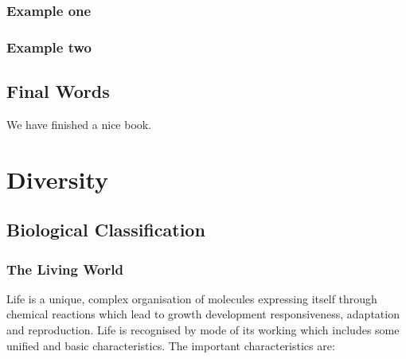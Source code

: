 \documentclass[
]{book}
\begin{document}
\hypertarget{example-one}{%
\section{Example one}\label{example-one}}

\hypertarget{example-two}{%
\section{Example two}\label{example-two}}

\hypertarget{final-words}{%
\chapter{Final Words}\label{final-words}}

We have finished a nice book.

\hypertarget{part-diversity}{%
\part{Diversity}\label{part-diversity}}

\hypertarget{biological-classification}{%
\chapter{Biological Classification}\label{biological-classification}}

\hypertarget{the-living-world}{%
\section{The Living World}\label{the-living-world}}

Life is a unique, complex organisation of molecules expressing itself through chemical reactions which lead to growth development responsiveness, adaptation and reproduction. Life is recognised by mode of its working which includes some unified and basic characteristics. The important characteristics are:
\end{document}
